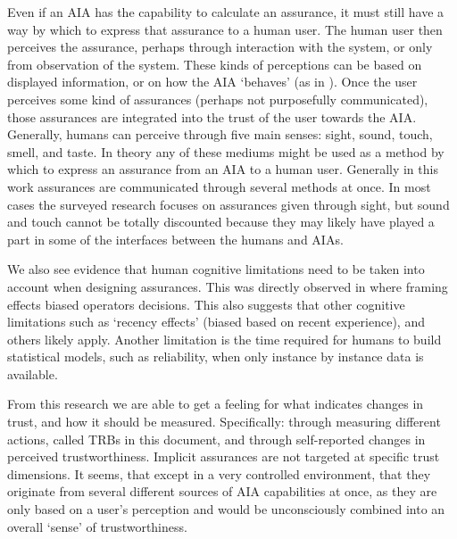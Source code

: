 Even if an AIA has the capability to calculate an assurance, it must still have a way by which to express that assurance to a human user. The human user then perceives the assurance, perhaps through interaction with the system, or only from observation of the system. These kinds of perceptions can be based on displayed information, or on how the AIA `behaves' (as in \cite{Salem2015-md}). Once the user perceives some kind of assurances (perhaps not purposefully communicated), those assurances are integrated into the trust of the user towards the AIA. Generally, humans can perceive through five main senses: sight, sound, touch, smell, and taste. In theory any of these mediums might be used as a method by which to express an assurance from an AIA to a human user. Generally in this work assurances are communicated through several methods at once. In most cases the surveyed research focuses on assurances given through sight, but sound and touch cannot be totally discounted because they may likely have played a part in some of the interfaces between the humans and AIAs. 

We also see evidence that human cognitive limitations need to be taken into account when designing assurances. This was directly observed in \cite{Freedy2007-sg,Riley1996-qm} where framing effects biased operators decisions. This also suggests that other cognitive limitations such as `recency effects' (biased based on recent experience), and others likely apply. Another limitation is the time required for humans to build statistical models, such as reliability, when only instance by instance data is available.

From this research we are able to get a feeling for what indicates changes in trust, and how it should be measured. Specifically: through measuring different actions, called TRBs in this document, and through self-reported changes in perceived trustworthiness. Implicit assurances are not targeted at specific trust dimensions. It seems, that except in a very controlled environment, that they originate from several different sources of AIA capabilities at once, as they are only based on a user's perception and would be unconsciously combined into an overall `sense' of trustworthiness.
